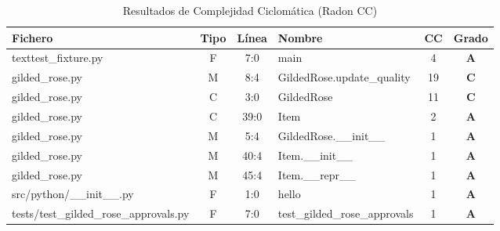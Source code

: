 \documentclass{article}
\newcommand{\good}[1]{\textbf{\textcolor{metGood}{#1}}}
\newcommand{\medium}[1]{\textbf{\textcolor{metMedium}{#1}}}
\begin{document}
\begin{table}[H]
    \centering
    \footnotesize
    \setlength{\tabcolsep}{4pt}
    \begin{tabular}{lccl cc}
        \toprule
        \textbf{Fichero}                       & \textbf{Tipo} & \textbf{Línea} & \textbf{Nombre}               & \textbf{CC} & \textbf{Grado} \\
        \midrule
        texttest\_fixture.py                   & F             & 7:0            & main                          & 4           & \good{A}       \\
        gilded\_rose.py                        & M             & 8:4            & GildedRose.update\_quality    & 19          & \medium{C}     \\
        gilded\_rose.py                        & C             & 3:0            & GildedRose                    & 11          & \medium{C}     \\
        gilded\_rose.py                        & C             & 39:0           & Item                          & 2           & \good{A}       \\
        gilded\_rose.py                        & M             & 5:4            & GildedRose.\_\_init\_\_       & 1           & \good{A}       \\
        gilded\_rose.py                        & M             & 40:4           & Item.\_\_init\_\_             & 1           & \good{A}       \\
        gilded\_rose.py                        & M             & 45:4           & Item.\_\_repr\_\_             & 1           & \good{A}       \\
        src/python/\_\_init\_\_.py             & F             & 1:0            & hello                         & 1           & \good{A}       \\
        tests/test\_gilded\_rose\_approvals.py & F             & 7:0            & test\_gilded\_rose\_approvals & 1           & \good{A}       \\
        \bottomrule
    \end{tabular}
    \caption{Resultados de Complejidad Ciclomática (Radon CC)}
    \label{tab:radon_cc}
\end{table}
\end{document}
